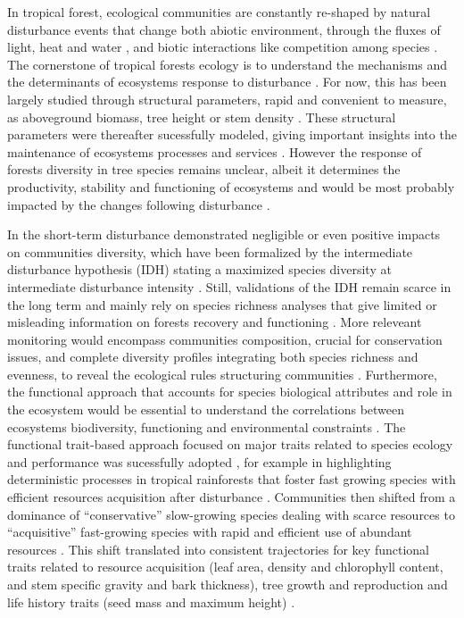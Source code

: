 \documentclass[fleqn,10pt]{ArtEcoFoG} %
\theoremstyle{definition}
\theoremstyle{definition}
\theoremstyle{definition}
\theoremstyle{remark}
\begin{document}
In tropical forest, ecological communities are constantly re-shaped by
natural disturbance events that change both abiotic environment, through
the fluxes of light, heat and water \citep{Goulamoussene2017}, and
biotic interactions like competition among species \citep{Herault2018}.
The cornerstone of tropical forests ecology is to understand the
mechanisms and the determinants of ecosystems response to disturbance
\citep{White2001, Chazdon2003a}. For now, this has been largely studied
through structural parameters, rapid and convenient to measure, as
aboveground biomass, tree height or stem density
\citep{Piponiot2016, Rutishauser2016}. These structural parameters were
thereafter sucessfully modeled, giving important insights into the
maintenance of ecosystems processes and services
\citep{Denslow2000, Blanc2009}. However the response of forests
diversity in tree species remains unclear, albeit it determines the
productivity, stability and functioning of ecosystems
\citep[\citet{Liang2016}]{Tilman2014} and would be most probably
impacted by the changes following disturbance \citep{Baraloto2012a}.

In the short-term disturbance demonstrated negligible or even positive
impacts on communities diversity, which have been formalized by the
intermediate disturbance hypothesis (IDH) stating a maximized species
diversity at intermediate disturbance intensity
\citep{Molino2001, Kariuki2006a, Berry2008a}. Still, validations of the
IDH remain scarce in the long term and mainly rely on species richness
analyses that give limited or misleading information on forests recovery
and functioning \citep{Martin2015, Chaudhary2016}. More releveant
monitoring would encompass communities composition, crucial for
conservation issues, and complete diversity profiles integrating both
species richness and evenness, to reveal the ecological rules
structuring communities \citep{Magurran1988, Lavorel2002, Bellwood2006}.
Furthermore, the functional approach that accounts for species
biological attributes and role in the ecosystem would be essential to
understand the correlations between ecosystems biodiversity, functioning
and environmental constraints
\citep{Violle2007b, Moretti2009, Baraloto2012a, Scheiter2013}. The
functional trait-based approach focused on major traits related to
species ecology and performance was sucessfully adopted
\citep{Diaz2005, Villeger2008a}, for example in highlighting
deterministic processes in tropical rainforests that foster fast growing
species with efficient resources acquisition after disturbance
\citep{Molino2001, Haddad2008, Ruger2009}. Communities then shifted from
a dominance of ``conservative'' slow-growing species dealing with scarce
resources to ``acquisitive'' fast-growing species with rapid and
efficient use of abundant resources
\citep{TerSteege2001, Reich2014, Herault2011}. This shift translated
into consistent trajectories for key functional traits related to
resource acquisition (leaf area, density and chlorophyll content, and
stem specific gravity and bark thickness), tree growth and reproduction
and life history traits (seed mass and maximum height)
\citep{Wright2004, Westoby2006a, Chave2009b}.
\end{document}
